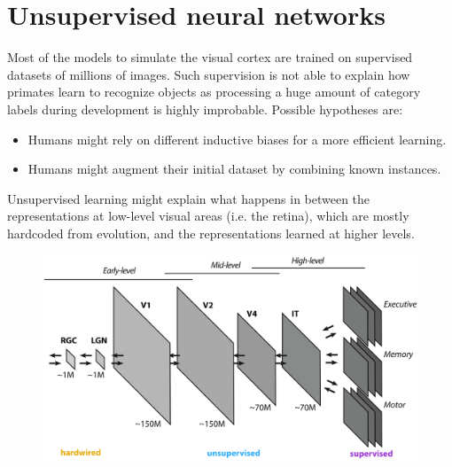 \section{Unsupervised neural networks}

Most of the models to simulate the visual cortex are trained on supervised datasets of millions of images.
Such supervision is not able to explain how primates learn to recognize objects as processing a huge amount of category labels during development is highly improbable.
Possible hypotheses are:
\begin{itemize}
    \item Humans might rely on different inductive biases for a more efficient learning.
    \item Humans might augment their initial dataset by combining known instances.
\end{itemize}

Unsupervised learning might explain what happens in between 
the representations at low-level visual areas (i.e. the retina), which are mostly hardcoded from evolution,
and the representations learned at higher levels.

\begin{figure}[H]
    \centering
    \includegraphics[width=0.55\linewidth]{./img/vision_learning_method.png}
\end{figure}

